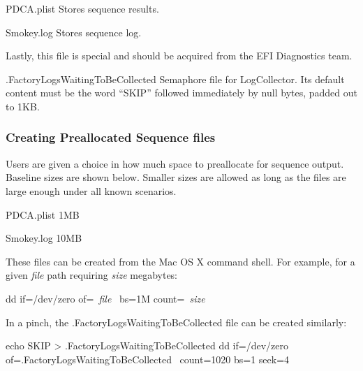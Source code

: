 \documentclass[11pt]{article}
\makeatletter
\newcommand{\iftt}[1]{\ifthenelse{\equal{\f@family}{\ttdefault}}{#1}{}}
\newcommand{\param}[1]{{\iftt{\bfseries}{}\itshape#1}}
\makeatother
\begin{document}
\begin{Definition}

\item[PDCA.plist] Stores sequence results.

\item[Smokey.log] Stores sequence log.

\end{Definition}

Lastly, this file is special and should be acquired from the EFI Diagnostics team.

\begin{Definition}

\item[.FactoryLogsWaitingToBeCollected] Semaphore file for LogCollector.  Its
	default content must be the word ``SKIP'' followed immediately by null
	bytes, padded out to 1KB.

\end{Definition}

\subsubsection{Creating Preallocated Sequence files}

Users are given a choice in how much space to preallocate for sequence output.
Baseline sizes are shown below.  Smaller sizes are allowed as long as the files
are large enough under all known scenarios.

\begin{Definition}

\item[PDCA.plist] 1MB

\item[Smokey.log] 10MB

\end{Definition}

These files can be created from the Mac OS X command shell.  For example, for a
given \param{file} path requiring \param{size} megabytes:

\begin{CommandLine}
dd if=/dev/zero of=~\param{file}~ bs=1M count=~\param{size}~
\end{CommandLine}

In a pinch, the .FactoryLogsWaitingToBeCollected file can be created similarly:

\begin{CommandLine}
echo SKIP > .FactoryLogsWaitingToBeCollected
dd if=/dev/zero of=.FactoryLogsWaitingToBeCollected \
	count=1020 bs=1 seek=4
\end{CommandLine}
\end{document}

